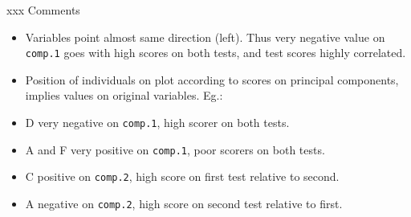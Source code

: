 \documentclass[ignorenonframetext,]{beamer}
\begin{document}
\begin{frame}[fragile]{xxx Comments}
\protect\hypertarget{xxx-comments-1}{}

\begin{itemize}
\item
  Variables point almost same direction (left). Thus very negative value
  on \texttt{comp.1} goes with high scores on both tests, and test
  scores highly correlated.
\item
  Position of individuals on plot according to scores on principal
  components, implies values on original variables. Eg.:
\item
  D very negative on \texttt{comp.1}, high scorer on both tests.
\item
  A and F very positive on \texttt{comp.1}, poor scorers on both tests.
\item
  C positive on \texttt{comp.2}, high score on first test relative to
  second.
\item
  A negative on \texttt{comp.2}, high score on second test relative to
  first.
\end{itemize}

\end{frame}
\end{document}

